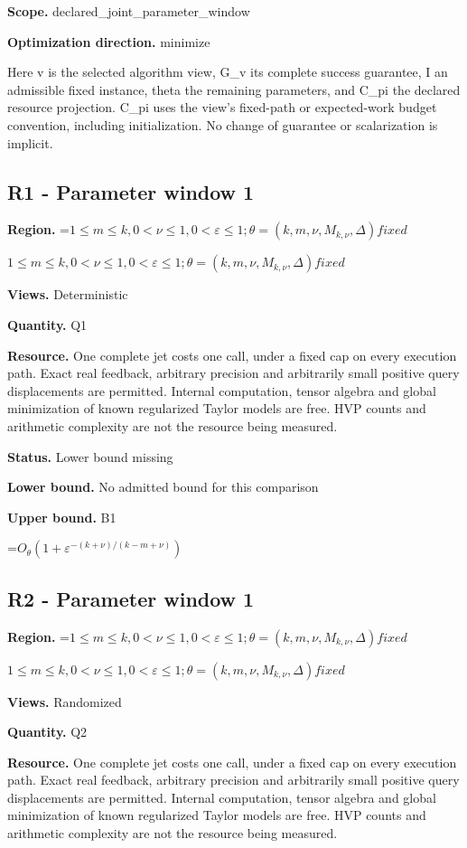 \documentclass[10pt,a4paper]{article}
\newcommand{\AtlasMath}[1]{\par\begingroup\centering\setbox0=\hbox{$\displaystyle #1$}\ifdim\wd0>1.4\linewidth\typeout{ATLAS WIDE FORMULA: \the\wd0}\fi\ifdim\wd0>\linewidth\resizebox{\linewidth}{!}{\box0}\else\box0\fi\par\endgroup}
\newcommand{\AtlasInlineMath}[1]{\begingroup\setbox0=\hbox{$#1$}\ifdim\wd0>.4\linewidth\endgroup\AtlasMath{#1}\else\endgroup$#1$\fi}
\begin{document}
\textbf{Scope.} declared\_joint\_parameter\_window

\textbf{Optimization direction.} minimize

Here v is the selected algorithm view, G\_v its complete success guarantee, I an admissible fixed instance, theta the remaining parameters, and C\_pi the declared resource projection. C\_pi uses the view's fixed-path or expected-work budget convention, including initialization. No change of guarantee or scalarization is implicit.

\subsection{R1 - Parameter window 1}
\textbf{Region.} \AtlasInlineMath{1\le m\le k,0<\nu\le 1,0<\varepsilon\le 1;\theta=(k,m,\nu,M_{k,\nu},\Delta) fixed}

\textbf{Views.} Deterministic

\textbf{Quantity.} Q1

\textbf{Resource.} One complete jet costs one call, under a fixed cap on every execution path. Exact real feedback, arbitrary precision and arbitrarily small positive query displacements are permitted. Internal computation, tensor algebra and global minimization of known regularized Taylor models are free. HVP counts and arithmetic complexity are not the resource being measured.

\textbf{Status.} Lower bound missing

\textbf{Lower bound.} No admitted bound for this comparison

\textbf{Upper bound.} B1

\AtlasMath{O_\theta(1+\varepsilon^{-(k+\nu)/(k-m+\nu)})}
\subsection{R2 - Parameter window 1}
\textbf{Region.} \AtlasInlineMath{1\le m\le k,0<\nu\le 1,0<\varepsilon\le 1;\theta=(k,m,\nu,M_{k,\nu},\Delta) fixed}

\textbf{Views.} Randomized

\textbf{Quantity.} Q2

\textbf{Resource.} One complete jet costs one call, under a fixed cap on every execution path. Exact real feedback, arbitrary precision and arbitrarily small positive query displacements are permitted. Internal computation, tensor algebra and global minimization of known regularized Taylor models are free. HVP counts and arithmetic complexity are not the resource being measured.
\end{document}
